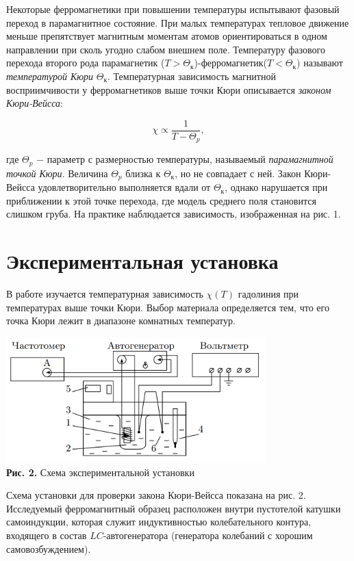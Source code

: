 \documentclass[a4paper,12pt]{article} %
\begin{document}
\hfill \break Некоторые ферромагнетики при повышении температуры испытывают фазовый переход в парамагнитное состояние. При малых температурах тепловое движение меньше препятствует магнитным моментам атомов ориентироваться в одном направлении при сколь угодно слабом внешнем поле. Температуру фазового перехода второго рода парамагнетик ($T > \Theta_\text{к}$)-ферромагнетик($T < \Theta_\text{к}$) называют \textit{температурой Кюри} $\Theta_\text{к}$. Температурная зависимость магнитной восприимчивости у ферромагнетиков выше точки Кюри  описывается \textit{законом Кюри-Вейсса}:

\begin{equation}\label{ linkname }
\chi \propto \frac{1}{T-\Theta_{p}},
\end{equation}

\hfill \break где $\Theta_{p}$ $-$ параметр с размерностью температуры, называемый \textit{парамагнитной точкой Кюри}. Величина $\Theta_{p}$ близка к $\Theta_\text{к}$, но не совпадает с ней. Закон Кюри-Вейсса удовлетворительно выполняется вдали от $\Theta_\text{к}$, однако нарушается при приближении к этой точке перехода, где модель среднего поля становится слишком груба. На практике наблюдается зависимость, изображенная на рис. 1.

\section{Экспериментальная установка}
\hfill \break В работе изучается температурная зависимость $\chi (T)$ гадолиния при температурах выше точки Кюри. Выбор материала определяется тем, что его точка Кюри лежит в диапазоне комнатных температур.

\begin{center}
\includegraphics[width=0.75\textwidth]{3.4.2_2.png}\\
\textbf{Рис. 2.}  Схема экспериментальной установки\\ 
\end{center}

\hfill \break Схема установки для проверки закона Кюри-Вейсса показана на рис. 2. Исследуемый ферромагнитный образец расположен внутри пустотелой катушки самоиндукции, которая служит индуктивностью колебательного контура, входящего в состав $LC$-автогенератора (генератора колебаний с хорошим самовозбуждением).
\end{document}

